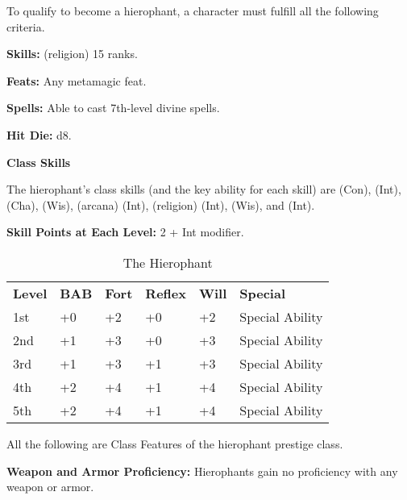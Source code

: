 
\Requirements

To qualify to become a hierophant, a character must fulfill all the following criteria.

\textbf{Skills:}  (religion) 15 ranks.

\textbf{Feats:} Any metamagic feat.

\textbf{Spells:} Able to cast 7th-level divine spells.

\Basics

\textbf{Hit Die:} d8.

\textbf{Class Skills}

The hierophant's class skills (and the key ability for each skill) are  
(Con),  (Int),  (Cha),  (Wis),  (arcana) (Int),  
(religion) (Int),  (Wis), and  (Int). 

\textbf{Skill Points at Each Level:} 2 + Int modifier.

\begin{table}[htb]
\caption{The Hierophant}
\centering
\begin{tabular}{*{6}{l}}
\textbf{Level} & \textbf{BAB} & \textbf{Fort} & \textbf{Reflex} & \textbf{Will} & \textbf{Special}\\
1st & +0 & +2 & +0 & +2 & Special Ability\\
2nd & +1 & +3 & +0 & +3 & Special Ability\\
3rd & +1 & +3 & +1 & +3 & Special Ability\\
4th & +2 & +4 & +1 & +4 & Special Ability\\
5th & +2 & +4 & +1 & +4 & Special Ability\\
\end{tabular}
\end{table}

\ClassFeatures

All the following are Class Features of the hierophant prestige class.

\textbf{Weapon and Armor Proficiency:} Hierophants gain no proficiency with any 
weapon or armor.


